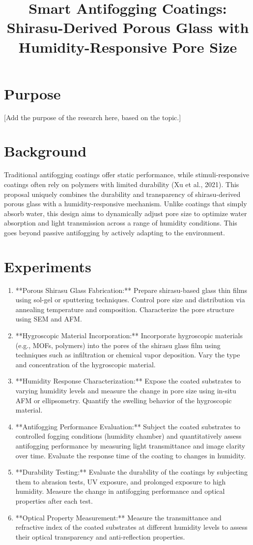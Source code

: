 \documentclass{article}
\title{Smart Antifogging Coatings: Shirasu-Derived Porous Glass with Humidity-Responsive Pore Size}
\author{}
\date{}
\begin{document}
\maketitle
\section{Purpose}
[Add the purpose of the research here, based on the topic.]

\section{Background}
Traditional antifogging coatings offer static performance, while stimuli-responsive coatings often rely on polymers with limited durability (Xu et al., 2021). This proposal uniquely combines the durability and transparency of shirasu-derived porous glass with a humidity-responsive mechanism. Unlike coatings that simply absorb water, this design aims to dynamically adjust pore size to optimize water absorption and light transmission across a range of humidity conditions. This goes beyond passive antifogging by actively adapting to the environment.

\section{Experiments}
\begin{enumerate}
\item **Porous Shirasu Glass Fabrication:** Prepare shirasu-based glass thin films using sol-gel or sputtering techniques. Control pore size and distribution via annealing temperature and composition. Characterize the pore structure using SEM and AFM.
\item **Hygroscopic Material Incorporation:** Incorporate hygroscopic materials (e.g., MOFs, polymers) into the pores of the shirasu glass film using techniques such as infiltration or chemical vapor deposition. Vary the type and concentration of the hygroscopic material.
\item **Humidity Response Characterization:** Expose the coated substrates to varying humidity levels and measure the change in pore size using in-situ AFM or ellipsometry. Quantify the swelling behavior of the hygroscopic material.
\item **Antifogging Performance Evaluation:** Subject the coated substrates to controlled fogging conditions (humidity chamber) and quantitatively assess antifogging performance by measuring light transmittance and image clarity over time. Evaluate the response time of the coating to changes in humidity.
\item **Durability Testing:** Evaluate the durability of the coatings by subjecting them to abrasion tests, UV exposure, and prolonged exposure to high humidity. Measure the change in antifogging performance and optical properties after each test.
\item **Optical Property Measurement:** Measure the transmittance and refractive index of the coated substrates at different humidity levels to assess their optical transparency and anti-reflection properties.
\end{enumerate}
\end{document}
